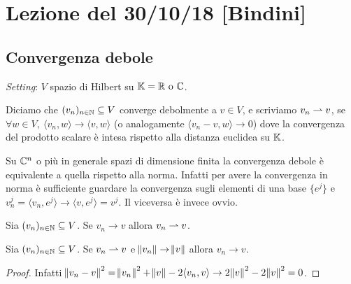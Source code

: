 \section{Lezione del 30/10/18 [Bindini]}

\subsection{Convergenza debole}
\emph{Setting}: $ V $ spazio di Hilbert su $ \mathbb{K} = \mathbb{R} \text{ o } \mathbb{C} $. 

\begin{definition}
    Diciamo che $ (v_n)_{n \in \mathbb{N}} \subseteq V $ converge debolmente a $ v \in V $, e scriviamo $ v_n \rightharpoonup v $, se $ \forall w \in V, \ {\langle v_n, w \rangle} \to {\langle v, w \rangle} $ (o analogamente $ {\langle v_n - v, w \rangle} \to 0 $) dove la convergenza del prodotto scalare è intesa rispetto alla distanza euclidea su $ \mathbb{K} $. 
\end{definition}

\begin{oss}
    Su $ \mathbb{C}^n $ o più in generale spazi di dimensione finita la convergenza debole è equivalente a quella rispetto alla norma. Infatti per avere la convergenza in norma è sufficiente guardare la convergenza sugli elementi di una base $ \{e^j\} $ e $ v_n^j = {\langle v_n, e^j\rangle} \to {\langle v, e^j\rangle} = v^j $. Il viceversa è invece ovvio.
\end{oss}

\begin{lemma}
    Sia $ (v_n)_{n \in \mathbb{N}} \subseteq V $. Se $ v_n \to v $ allora $ v_n \rightharpoonup v $.
\end{lemma}

\begin{lemma}
    Sia $ (v_n)_{n \in \mathbb{N}} \subseteq V $. Se $ v_n \rightharpoonup v $ e $ \norm{v_n} \to \norm{v} $ allora $ v_n \to v $.
\end{lemma}
\begin{proof}
    Infatti $ \norm{v_n - v}^2 = \norm{v_n}^2 + \norm{v} - 2 {\langle v_n, v \rangle} \to 2\norm{v}^2 - 2\norm{v}^2 = 0 $. 
\end{proof}

